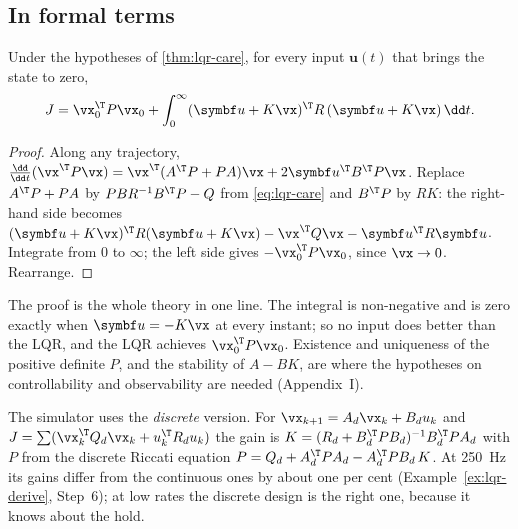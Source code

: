 \subsection{In formal terms}

\begin{theorem}
\label{thm:lqr-proof}
Under the hypotheses of \cref{thm:lqr-care}, for every input $\symbf u(t)$ that brings the state to zero,
\begin{equation*}
  J = \vx_0^\T P\vx_0 + \int_0^\infty (\symbf u + K\vx)^\T R\,(\symbf u + K\vx)\,\dd t .
\end{equation*}
\end{theorem}
\begin{proof}
Along any trajectory, $\frac{\dd}{\dd t}(\vx^\T P\vx) = \vx^\T(A^\T P + PA)\vx + 2\symbf u^\T B^\T P\vx$. Replace $A^\T P + PA$ by $PBR^{-1}B^\T P - Q$ from \cref{eq:lqr-care} and $B^\T P$ by $RK$: the right-hand side becomes $(\symbf u + K\vx)^\T R(\symbf u + K\vx) - \vx^\T Q\vx - \symbf u^\T R\symbf u$. Integrate from 0 to $\infty$; the left side gives $-\vx_0^\T P\vx_0$, since $\vx \to 0$. Rearrange.
\end{proof}

The proof is the whole theory in one line. The integral is non-negative and is zero exactly when $\symbf u = -K\vx$ at every instant; so no input does better than the LQR, and the LQR achieves $\vx_0^\T P\vx_0$. Existence and uniqueness of the positive definite $P$, and the stability of $A - BK$, are where the hypotheses on controllability and observability are needed (Appendix~I).

The simulator uses the \emph{discrete} version. For $\vx_{k+1} = A_d\vx_k + B_du_k$ and $J = \sum(\vx_k^\T Q_d\vx_k + u_k^\T R_du_k)$ the gain is $K = (R_d + B_d^\T PB_d)^{-1}B_d^\T PA_d$ with $P$ from the discrete Riccati equation $P = Q_d + A_d^\T PA_d - A_d^\T PB_d\,K$. At \SI{250}{Hz} its gains differ from the continuous ones by about one per cent (Example~\ref{ex:lqr-derive}, Step~6); at low rates the discrete design is the right one, because it knows about the hold.

